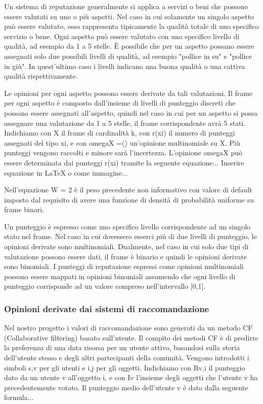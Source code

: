 \documentclass{report}
\begin{document}
	Un sistema di reputazione generalmente si applica a servizi o beni che
	possono essere valutati su uno o più aspetti. Nel caso in cui solamente
	un singolo aspetto può essere valutato, esso rappresenta tipicamente la
	qualità totale di uno specifico servizio o bene. Ogni aspetto può essere
	valutato con uno specifico livello di qualità, ad esempio da 1 a 5
	stelle. È possibile che per un aspetto possano essere assegnati solo due
	possibili livelli di qualità, ad esempio "pollice in su" e "pollice in
	giù". In quest'ultimo caso i livelli indicano una buona qualità o una
	cattiva qualità rispettivamente.
	
	Le opinioni per ogni aspetto possono essere derivate da tali
	valutazioni. Il frame per ogni aspetto è composto dall'insieme di
	livelli di punteggio discreti che possono essere assegnati all'aspetto,
	quindi nel caso in cui per un aspetto si possa assegnare una valutazione
	da 1 a 5 stelle, il frame corrispondente avrà 5 stati. Indichiamo con X
	il frame di cardinalità k, con r(xi) il numero di punteggi assegnati del
	tipo xi, e con omegaX =() un'opinione multinomiale su X. Più punteggi
	vengono raccolti e minore sarà l'incertezza. L'opinione omegaX può
	essere determinata dai punteggi r(xi) tramite la seguente equazione...
	Inserire equazione in LaTeX o come immagine...
	
	Nell'equazione W = 2 è il peso precedente non informativo con valore di
	default imposto dal requisito di avere una funzione di densità di
	probabilità uniforme su frame binari.
	
	Un punteggio è espresso come uno specifico livello corrispondente ad un
	singolo stato nel frame. Nel caso in cui dovessero esserci più di due
	livelli di punteggio, le opinioni derivate sono multinomiali. Dualmente,
	nel caso in cui solo due tipi di valutazione possono essere dati, il
	frame è binario e quindi le opinioni derivate sono binomiali. I punteggi
	di reputazione espressi come opinioni multinomiali possono essere
	mappati in opinioni binomiali assumendo che ogni livello di punteggio
	corrisponde ad un valore compreso nell'intervallo {[}0,1{]}.
	
	\hypertarget{header-n108}{%
		\subsubsection{Opinioni derivate dai sistemi di
			raccomandazione}\label{header-n108}}
	
	Nel nostro progetto i valori di raccomandazione sono generati da un
	metodo CF (Collaborative filtering) basato sull'utente. Il compito dei
	metodi CF è di predirre la preferenza di una data risorsa per un utente
	attivo, basandosi sulla storia dell'utente stesso e degli altri
	partecipanti della comunità. Vengono introdotti i simboli s,v per gli
	utenti e i,j per gli oggetti. Indichiamo con Rv,i il punteggio dato da
	un utente v all'oggetto i, e con Iv l'insieme degli oggetti che l'utente
	v ha precedentemente votato. Il punteggio medio dell'utente v è dato
	dalla seguente formula...
	
\end{document}
